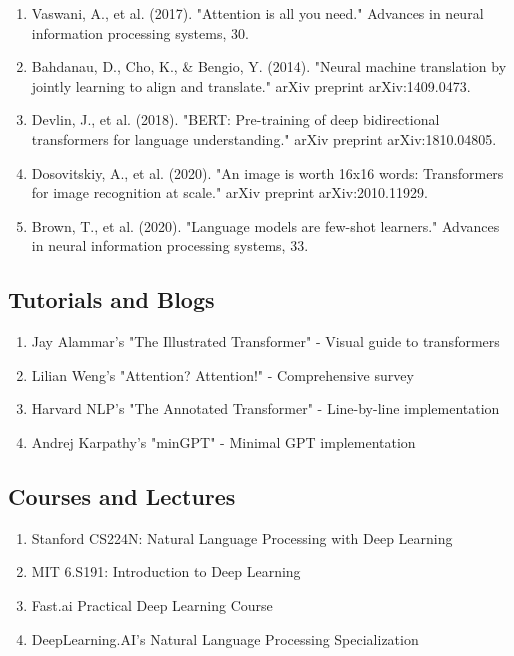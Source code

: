 \begin{enumerate}
    \item Vaswani, A., et al. (2017). "Attention is all you need." Advances in neural information processing systems, 30.

    \item Bahdanau, D., Cho, K., \& Bengio, Y. (2014). "Neural machine translation by jointly learning to align and translate." arXiv preprint arXiv:1409.0473.

    \item Devlin, J., et al. (2018). "BERT: Pre-training of deep bidirectional transformers for language understanding." arXiv preprint arXiv:1810.04805.

    \item Dosovitskiy, A., et al. (2020). "An image is worth 16x16 words: Transformers for image recognition at scale." arXiv preprint arXiv:2010.11929.

    \item Brown, T., et al. (2020). "Language models are few-shot learners." Advances in neural information processing systems, 33.
\end{enumerate}

\subsection{Tutorials and Blogs}

\begin{enumerate}
    \item Jay Alammar's "The Illustrated Transformer" - Visual guide to transformers
    \item Lilian Weng's "Attention? Attention!" - Comprehensive survey
    \item Harvard NLP's "The Annotated Transformer" - Line-by-line implementation
    \item Andrej Karpathy's "minGPT" - Minimal GPT implementation
\end{enumerate}

\subsection{Courses and Lectures}

\begin{enumerate}
    \item Stanford CS224N: Natural Language Processing with Deep Learning
    \item MIT 6.S191: Introduction to Deep Learning
    \item Fast.ai Practical Deep Learning Course
    \item DeepLearning.AI's Natural Language Processing Specialization
\end{enumerate}

